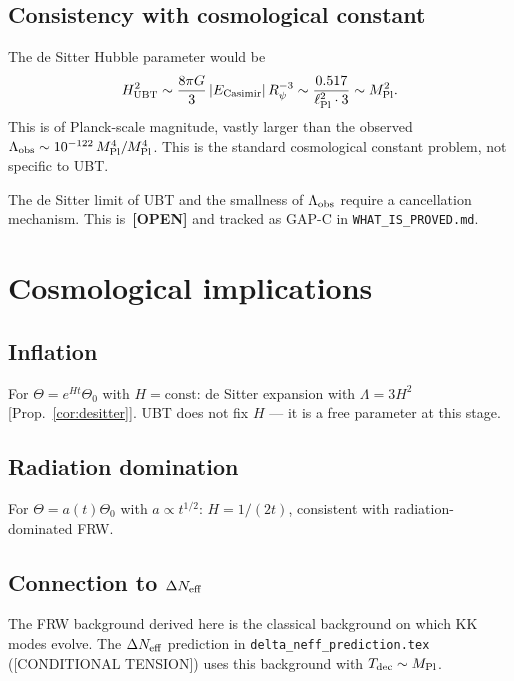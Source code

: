 \documentclass[12pt,a4paper]{article}
\begin{document}
\subsection{Consistency with cosmological constant}

The de Sitter Hubble parameter would be
\[
  H_{\rm UBT}^2 \sim \frac{8\pi G}{3}\,|E_{\rm Casimir}|\,R_\psi^{-3}
  \sim \frac{0.517}{\ell_{\rm Pl}^2\cdot 3} \sim M_{\rm Pl}^2.
\]
This is of Planck-scale magnitude, vastly larger than the observed
$\Lambda_{\rm obs} \sim 10^{-122}\,M_{\rm Pl}^4/M_{\rm Pl}^4$.
This is the standard cosmological constant problem, not specific to UBT.

\begin{openproblembox}
The de Sitter limit of UBT and the smallness of $\Lambda_{\rm obs}$
require a cancellation mechanism.  This is~\textbf{[OPEN]} and tracked
as GAP-C in \texttt{WHAT\_IS\_PROVED.md}.
\end{openproblembox}

\section{Cosmological implications}

\subsection{Inflation}
For $\Theta = e^{Ht}\Theta_0$ with $H = \mathrm{const}$:
de Sitter expansion with $\Lambda = 3H^2$ [Prop.~\ref{cor:desitter}].
UBT does not fix $H$ --- it is a free parameter at this stage.

\subsection{Radiation domination}
For $\Theta = a(t)\Theta_0$ with $a \propto t^{1/2}$:
$H = 1/(2t)$, consistent with radiation-dominated FRW.

\subsection{Connection to $\Delta N_{\rm eff}$}
\label{sec:delta_neff}
The FRW background derived here is the classical background
on which KK modes evolve. The $\Delta N_{\rm eff}$ prediction
in \texttt{delta\_neff\_prediction.tex} ([CONDITIONAL TENSION])
uses this background with $T_{\rm dec}\sim M_{\rm Pl}$.
\end{document}
